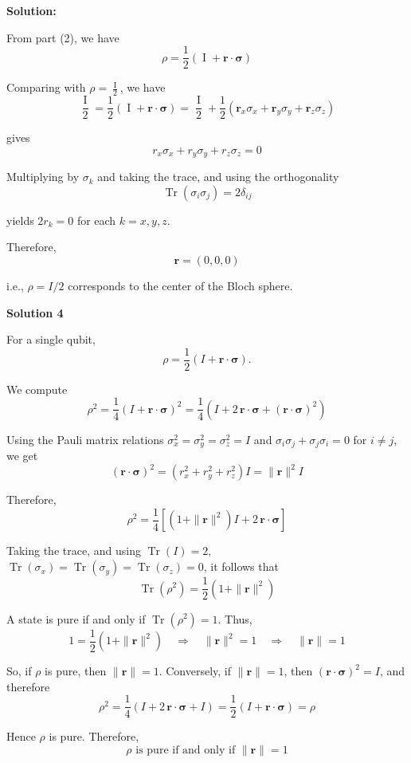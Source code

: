 \documentclass[11pt]{article}
\newenvironment{solution}
{\par\noindent\textbf{Solution:}\par}
{\vspace{1em}}
\begin{document}
\begin{solution}
From part (2), we have \[\rho=\dfrac12\left(\operatorname{I}+\mathbf{r}\cdot\boldsymbol{\sigma}\right)\]

Comparing with \(\rho=\frac{\operatorname{I}}{2}\), we have \[\frac{\operatorname{I}}{2} = \dfrac12\left(\operatorname{I}+\mathbf{r}\cdot\boldsymbol{\sigma}\right) = \frac{\operatorname{I}}{2} + \frac12\left(\mathbf{r}_x\sigma_x+\mathbf{r}_y\sigma_y+\mathbf{r}_z\sigma_z\right)\]

gives \[r_x\sigma_x+r_y\sigma_y+r_z\sigma_z=0\]

Multiplying by \(\sigma_k\) and taking the trace, and using the orthogonality \[\operatorname{Tr}(\sigma_i\sigma_j)=2\delta_{ij}\]

yields \(2r_k=0\) for each \(k=x,y,z\).

Therefore, \[\boxed{\mathbf{r}=(0,0,0)}\]

i.e., \(\rho=I/2\) corresponds to the center of the Bloch sphere.

\textbf{Solution 4}

For a single qubit, \[\rho=\frac12\left(I+\mathbf r\cdot\boldsymbol{\sigma}\right).\]

We compute \[\rho^2 = \frac14\left(I+\mathbf r\cdot\boldsymbol{\sigma}\right)^2 = \frac14\left(I+2\,\mathbf r\cdot\boldsymbol{\sigma}+(\mathbf r\cdot\boldsymbol{\sigma})^2\right)\]

Using the Pauli matrix relations $\sigma_x^2=\sigma_y^2=\sigma_z^2=I$ and $\sigma_i\sigma_j+\sigma_j\sigma_i=0$ for $i\ne j$, we get \[(\mathbf r\cdot\boldsymbol{\sigma})^2 = (r_x^2+r_y^2+r_z^2)I = \|\mathbf r\|^2 I\]

Therefore, \[\rho^2 = \frac14\left[(1+\|\mathbf r\|^2)I+2\,\mathbf r\cdot\boldsymbol{\sigma}\right]\]

Taking the trace, and using $\operatorname{Tr}(I)=2$, $\operatorname{Tr}(\sigma_x)=\operatorname{Tr}(\sigma_y)=\operatorname{Tr}(\sigma_z)=0$, it follows that \[\operatorname{Tr}(\rho^2) = \frac12(1+\|\mathbf r\|^2)\]

A state is pure if and only if $\operatorname{Tr}(\rho^2)=1$. Thus, \[1=\frac12(1+\|\mathbf r\|^2) \quad\Longrightarrow\quad \|\mathbf r\|^2=1 \quad\Longrightarrow\quad \|\mathbf r\|=1\]

So, if $\rho$ is pure, then $\|\mathbf r\|=1$. Conversely, if $\|\mathbf r\|=1$, then $(\mathbf r\cdot\boldsymbol{\sigma})^2=I$, and therefore \[\rho^2 = \frac14\left(I+2\,\mathbf r\cdot\boldsymbol{\sigma}+I\right) = \frac12\left(I+\mathbf r\cdot\boldsymbol{\sigma}\right) = \rho\]

Hence $\rho$ is pure. Therefore, \[\boxed{\rho \text{ is pure if and only if } \|\mathbf r\|=1}\]

\end{solution}
\end{document}
